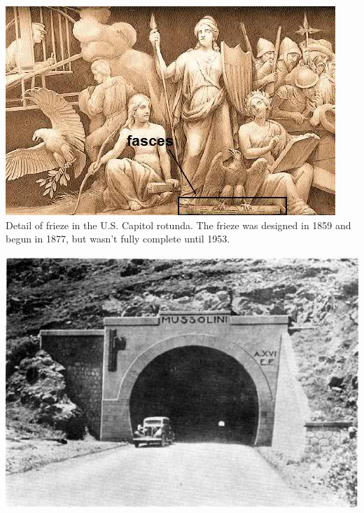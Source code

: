 \begin{frame}
    \centering
    \includegraphics[height=.8\textheight]{img/fasces/teut1.jpg} \\
    Detail of frieze in the U.S. Capitol rotunda. The frieze was designed in 1859 and begun in 1877, but wasn't fully complete until 1953. \\
\end{frame}
\begin{frame}
    \centering
    \includegraphics[width=.9\textwidth]{img/fasces/tunnel.jpg} \\
\end{frame}
